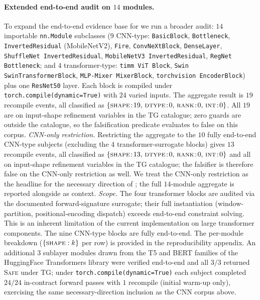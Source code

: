 \paragraph{Extended end-to-end audit on $14$ modules.}
To expand the end-to-end evidence base for
 we run a broader audit: $14$
importable \texttt{nn.Module} subclasses (9 CNN-type:
\texttt{BasicBlock}, \texttt{Bottleneck},
\texttt{InvertedResidual} (MobileNetV2), \texttt{Fire},
\texttt{ConvNeXtBlock}, \texttt{DenseLayer},
\texttt{ShuffleNet InvertedResidual},
\texttt{MobileNetV3 InvertedResidual},
\texttt{RegNet Bottleneck}; and $4$ transformer-type:
\texttt{timm ViT Block}, \texttt{Swin SwinTransformerBlock},
\texttt{MLP-Mixer MixerBlock},
\texttt{torchvision EncoderBlock}) plus one
\texttt{ResNet50} layer. Each block is compiled under
\texttt{torch.compile(dynamic=True)} with $24$ varied inputs.
The aggregate result is $19$ recompile events, all classified
as $\{\textsc{shape}\!:\!19,\,\textsc{dtype}\!:\!0,\,\textsc{rank}\!:\!0,\,\textsc{int}\!:\!0\}$.
All $19$ are on input-shape refinement variables in the
\textsc{TG} catalogue; zero guards are outside the catalogue,
so the falsification predicate evaluates to false on this
corpus.
\emph{CNN-only restriction.} Restricting the
aggregate to the $10$ fully end-to-end CNN-type subjects
(excluding the $4$ transformer-surrogate blocks)
gives $13$ recompile events, all classified as
$\{\textsc{shape}\!:\!13,\,\textsc{dtype}\!:\!0,\,
\textsc{rank}\!:\!0,\,\textsc{int}\!:\!0\}$ and all on
input-shape refinement variables in the \textsc{TG} catalogue;
the falsifier is therefore false on the CNN-only restriction
as well. We treat the CNN-only restriction as the headline for
the necessary direction of ; the full
$14$-module aggregate is reported alongside as context.
\emph{Scope.} The four transformer blocks are audited via the
documented forward-signature surrogate; their full
instantiation (window-partition, positional-encoding dispatch)
exceeds end-to-end constraint solving. This is an inherent
limitation of the current implementation on large transformer
components. The nine CNN-type blocks are fully end-to-end.
The per-module breakdown ($\{\textsc{shape}: k\}$ per row) is
provided in the reproducibility appendix.
An additional $3$ sublayer modules drawn from the T5 and BERT families of
the HuggingFace Transformers library were verified end-to-end and all
$3/3$ returned \textsc{Safe} under \textsc{TG}; under
\texttt{torch.compile(dynamic=True)} each subject completed $24/24$
in-contract forward passes with $1$ recompile (initial warm-up only),
exercising the same necessary-direction inclusion as the CNN corpus above.

